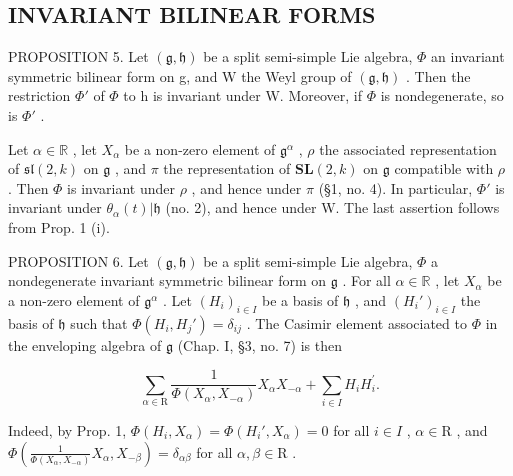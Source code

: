 \subsection{INVARIANT BILINEAR FORMS}

PROPOSITION 5. Let \((\mathfrak{g},\mathfrak{h})\) be a split semi-simple Lie algebra, \(\Phi\) an invariant symmetric bilinear form on g, and W the Weyl group of \((\mathfrak{g},\mathfrak{h})\) . Then the restriction \(\Phi'\) of \(\Phi\) to h is invariant under W. Moreover, if \(\Phi\) is nondegenerate, so is \(\Phi'\) .

Let \(\alpha \in \mathbb{R}\) , let \(X_{\alpha}\) be a non-zero element of \(\mathfrak{g}^{\alpha}\) , \(\rho\) the associated representation of \(\mathfrak{sl}(2,k)\) on \(\mathfrak{g}\) , and \(\pi\) the representation of \(\mathbf{SL}(2,k)\) on \(\mathfrak{g}\) compatible with \(\rho\) . Then \(\varPhi\) is invariant under \(\rho\) , and hence under \(\pi\) (§1, no. 4). In particular, \(\varPhi'\) is invariant under \(\theta_{\alpha}(t)|\mathfrak{h}\) (no. 2), and hence under W. The last assertion follows from Prop. 1 (i).

PROPOSITION 6. Let \((\mathfrak{g},\mathfrak{h})\) be a split semi-simple Lie algebra, \(\varPhi\) a nondegenerate invariant symmetric bilinear form on \(\mathfrak{g}\) . For all \(\alpha \in \mathbb{R}\) , let \(X_{\alpha}\) be a non-zero element of \(\mathfrak{g}^{\alpha}\) . Let \((H_i)_{i\in I}\) be a basis of \(\mathfrak{h}\) , and \((H_i')_{i\in I}\) the basis of \(\mathfrak{h}\) such that \(\varPhi(H_i,H_j') = \delta_{ij}\) . The Casimir element associated to \(\varPhi\) in the enveloping algebra of \(\mathfrak{g}\) (Chap. I, §3, no. 7) is then

\[
\sum_ {\alpha \in \mathrm{R}} \frac {1}{\varPhi (X _ {\alpha} , X _ {- \alpha})} X _ {\alpha} X _ {- \alpha} + \sum_ {i \in I} H _ {i} H _ {i} ^ {\prime}.
\]

Indeed, by Prop. 1, \(\Phi(H_i, X_\alpha) = \Phi(H_i', X_\alpha) = 0\) for all \(i \in I\) , \(\alpha \in \mathrm{R}\) , and \(\Phi\left(\frac{1}{\Phi(X_\alpha, X_{-\alpha})} X_\alpha, X_{-\beta}\right) = \delta_{\alpha\beta}\) for all \(\alpha, \beta \in \mathrm{R}\) .

